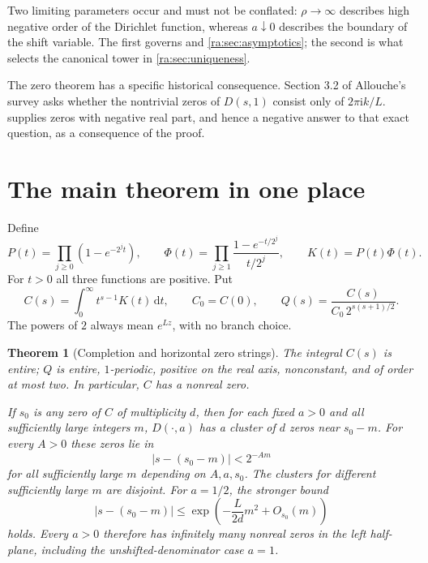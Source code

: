 \documentclass[11pt,a4paper,oneside,openany]{book}
\numberwithin{equation}{chapter}
\newtheorem{theorem}{Theorem}[chapter]
\theoremstyle{definition}
\theoremstyle{remark}
\newcommand{\dd}{\,\mathrm d}
\newcommand{\ii}{\mathrm i}
\newcommand{\abs}[1]{\left\lvert #1\right\rvert}
\begin{document}
Two limiting parameters occur and must not be conflated: $\rho\to\infty$
describes high negative order of the Dirichlet function, whereas
$a\downarrow0$ describes the boundary of the shift variable. The first
governs  and
\cref{ra:sec:asymptotics}; the second is what selects the canonical tower in
\cref{ra:sec:uniqueness}.

The zero theorem has a specific historical consequence. Section 3.2 of
Allouche's survey \cite{allouche2015} asks whether the nontrivial zeros of
$D(s,1)$ consist only of $2\pi\ii k/L$.  supplies
zeros with negative real part, and hence a negative answer to that exact
question, as a consequence of the proof.


\section{The main theorem in one place}
Define
\begin{equation}
 P(t)=\prod_{j\ge0}(1-e^{-2^jt}),\qquad
 \Phi(t)=\prod_{j\ge1}\frac{1-e^{-t/2^j}}{t/2^j},
 \qquad K(t)=P(t)\Phi(t).
 \label{dc:eq:three-products}
\end{equation}
For $t>0$ all three functions are positive. Put
\begin{equation}
 C(s)=\int_0^\infty t^{s-1}K(t)\dd t,
 \qquad C_0=C(0),\qquad
 Q(s)=\frac{C(s)}{C_0\,2^{s(s+1)/2}}.
 \label{dc:eq:CQ-def}
\end{equation}
The powers of $2$ always mean $e^{Lz}$, with no branch choice.

\begin{theorem}[Completion and horizontal zero strings]
\label{dc:thm:overview}
The integral $C(s)$ is entire; $Q$ is entire, $1$-periodic,
positive on the real axis, nonconstant, and of order at most two.
In particular, $C$ has a nonreal zero.

If $s_0$ is any zero of $C$ of multiplicity $d$, then for each fixed
$a>0$ and all sufficiently large integers $m$, $D(\cdot,a)$ has a
cluster of $d$ zeros near $s_0-m$. For every $A>0$ these zeros lie in
\begin{equation}
 \abs{s-(s_0-m)}<2^{-Am}
 \label{dc:eq:zero-supergeometric}
\end{equation}
for all sufficiently large $m$ depending on $A,a,s_0$.
The clusters for different sufficiently large $m$ are disjoint.
For $a=1/2$, the stronger bound
\begin{equation}
 \abs{s-(s_0-m)}\le
 \exp\left(-\frac{L}{2d}m^2+O_{s_0}(m)\right)
 \label{dc:eq:zero-gaussian}
\end{equation}
holds. Every $a>0$ therefore has infinitely many nonreal zeros in the
left half-plane, including the unshifted-denominator case $a=1$.
\end{theorem}
\end{document}
